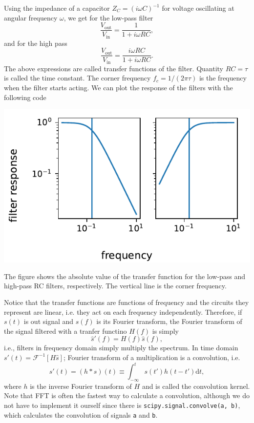 \documentclass{article}
\newcommand{\dd}{\ensuremath{\mathrm{d}}}
\newcommand{\ls}[1]{\lstinline{#1}}
\begin{document}
Using the impedance of a capacitor $Z_C = (i\omega C)^{-1}$ for voltage oscillating at angular frequency $\omega$, we get for the low-pass filter
\begin{equation}
    \frac{V_\mathrm{out}}{V_\mathrm{in}} = \frac{1}{1 + i\omega RC},
\end{equation}
and for the high pass
\begin{equation}
    \frac{V_\mathrm{out}}{V_\mathrm{in}} = \frac{i\omega RC}{1 + i\omega RC}.
\end{equation}
The above expressions are called transfer functions of the filter. Quantity $RC = \tau$ is called the time constant. The corner frequency $f_c = 1/(2\pi\tau)$ is the frequency when the filter starts acting. We can plot the response of the filters with the following code

\begin{center}
    \includegraphics{RC_filters.pdf}
\end{center}
The figure shows the absolute value of the transfer function for the low-pass and high-pass RC filters, respectively. The vertical line is the corner frequency.

Notice that the transfer functions are functions of frequency and the circuits they represent are linear, i.e. they act on each frequency independently. Therefore, if $s(t)$ is out signal and $\hat s(f)$ is its Fourier transform, the Fourier transform of the signal filtered with a tranfer functino $H(f)$ is simply
\begin{equation}
    \hat s'(f) = H(f)\hat s(f),
\end{equation}
i.e., filters in frequency domain simply multiply the spectrum. In time domain $s'(t) = \mathcal{F}^{-1}[H\hat s]$; Fourier transform of a multiplication is a convolution, i.e.
\begin{equation}
    s'(t) = (h*s)(t) \equiv \int_{-\infty}^t s(t')h(t - t')\dd t,
\end{equation}
where $h$ is the inverse Fourier transform of $H$ and is called the convolution kernel. Note that FFT is often the fastest way to calculate a convolution, although we do not have to implement it ourself since there is \ls{scipy.signal.convolve(a, b)}, which calculates the convolution of signals \ls{a} and \ls{b}.
\end{document}
